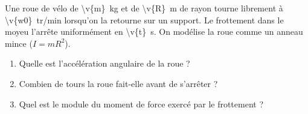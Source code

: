 Une roue de vélo de \qty{\v{m}}{kg} et de \qty{\v{R}}{m} de rayon tourne librement à \qty{\v{w0}}{tr/min} lorsqu'on la retourne sur un support. Le frottement dans le moyeu l'arrête uniformément en \qty{\v{t}}{s}. On modélise la roue comme un anneau mince ($I = mR^2$).

\begin{enumerate}[label=\alph*)]
    \item Quelle est l'accélération angulaire de la roue ?
    \item Combien de tours la roue fait-elle avant de s'arrêter ?
    \item Quel est le module du moment de force exercé par le frottement ?
\end{enumerate}
